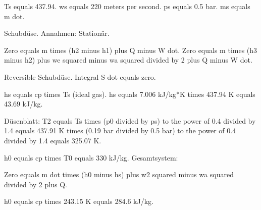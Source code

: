 Ts equals 437.94. ws equals 220 meters per second. ps equals 0.5 bar. ms equals m dot. 

Schubdüse. Annahmen: Stationär. 

Zero equals m times (h2 minus h1) plus Q minus W dot. Zero equals m times (h3 minus h2) plus we squared minus wa squared divided by 2 plus Q minus W dot. 

Reversible Schubdüse. Integral S dot equals zero. 

hs equals cp times Ts (ideal gas). hs equals 7.006 kJ/kg*K times 437.94 K equals 43.69 kJ/kg. 

Düsenblatt: T2 equals Ts times (p0 divided by ps) to the power of 0.4 divided by 1.4 equals 437.91 K times (0.19 bar divided by 0.5 bar) to the power of 0.4 divided by 1.4 equals 325.07 K.

h0 equals cp times T0 equals 330 kJ/kg. Gesamtsystem: 

Zero equals m dot times (h0 minus hs) plus w2 squared minus wa squared divided by 2 plus Q. 

h0 equals cp times 243.15 K equals 284.6 kJ/kg.